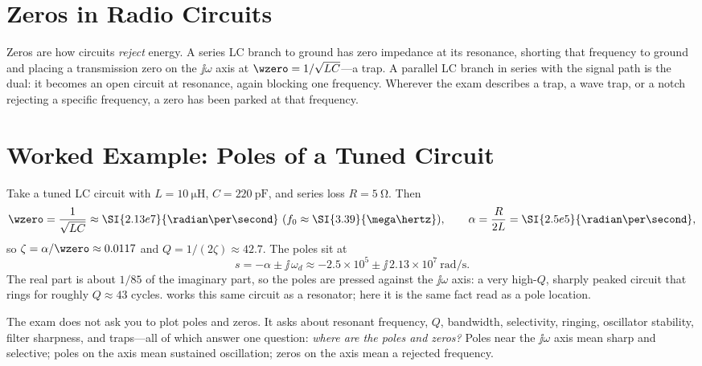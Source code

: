 \section{Zeros in Radio Circuits}
Zeros are how circuits \emph{reject} energy. A series LC branch to ground has zero
impedance at its resonance, shorting that frequency to ground and placing a
transmission zero on the \(\jj\omega\) axis at \(\wzero=1/\sqrt{LC}\)---a trap. A
parallel LC branch in series with the signal path is the dual: it becomes an open
circuit at resonance, again blocking one frequency. Wherever the exam describes a
trap, a wave trap, or a notch rejecting a specific frequency, a zero has been
parked at that frequency.

\section{Worked Example: Poles of a Tuned Circuit}
Take a tuned LC circuit with \(L=\SI{10}{\micro\henry}\),
\(C=\SI{220}{\pico\farad}\), and series loss \(R=\SI{5}{\ohm}\). Then
\[
\wzero=\frac{1}{\sqrt{LC}}\approx\SI{2.13e7}{\radian\per\second}
\ (f_0\approx\SI{3.39}{\mega\hertz}),
\qquad
\alpha=\frac{R}{2L}=\SI{2.5e5}{\radian\per\second},
\]
so \(\zeta=\alpha/\wzero\approx0.0117\) and \(Q=1/(2\zeta)\approx42.7\). The poles
sit at
\[
s=-\alpha\pm\jj\,\omega_d\approx-2.5\times10^{5}\pm\jj\,2.13\times10^{7}
\ \si{\radian\per\second}.
\]
The real part is about \(1/85\) of the imaginary part, so the poles are pressed
against the \(\jj\omega\) axis: a very high-\(Q\), sharply peaked circuit that
rings for roughly \(Q\approx43\) cycles.  works this same circuit as
a resonator; here it is the same fact read as a pole location.

\begin{exambox}
The exam does not ask you to plot poles and zeros. It asks about resonant
frequency, \(Q\), bandwidth, selectivity, ringing, oscillator stability, filter
sharpness, and traps---all of which answer one question: \emph{where are the poles
and zeros?} Poles near the \(\jj\omega\) axis mean sharp and selective; poles on
the axis mean sustained oscillation; zeros on the axis mean a rejected frequency.
\end{exambox}
